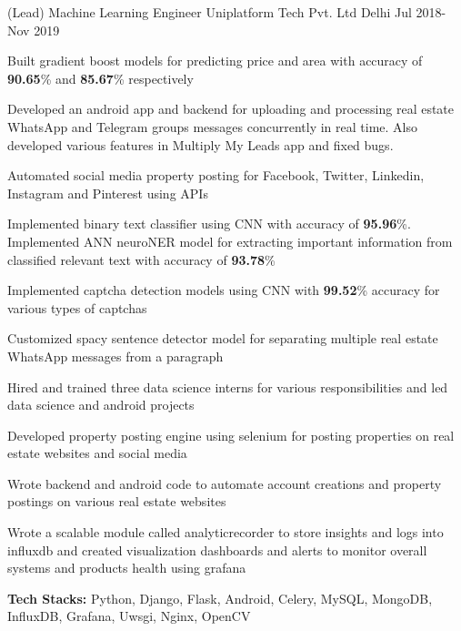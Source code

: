 \begin{cventries}
  \cventry
    {(Lead) Machine Learning Engineer} %
    {Uniplatform Tech Pvt. Ltd} %
    {Delhi} %
    {Jul 2018- Nov 2019} %
    {
      \begin{cvitems} %
        \item{Built gradient boost models for predicting price and area with accuracy of \textbf{90.65}\% and \textbf{85.67}\% respectively}
        \item {Developed an android app and backend for uploading and processing real estate WhatsApp and Telegram groups messages concurrently in real time. Also developed various features in Multiply My Leads app and fixed bugs.}
        \item {Automated social media property posting for Facebook, Twitter, Linkedin, Instagram and Pinterest using APIs}
        \item {Implemented binary text classifier using CNN with accuracy of \textbf{95.96}\%. Implemented ANN neuroNER model for extracting important information from classified relevant text with accuracy of \textbf{93.78}\%}
        \item {Implemented captcha detection models using CNN with \textbf{99.52}\% accuracy for various types of captchas}
        \item {Customized spacy sentence detector model for separating multiple real estate WhatsApp messages from a paragraph}
        \item {Hired and trained three data science interns for various responsibilities and led data science and android projects}
        \item {Developed property posting engine using selenium for posting properties on real estate websites and social media}
        \item {Wrote backend and android code to automate account creations and property postings on various real estate websites}
        \item {Wrote a scalable module called analyticrecorder to store insights and logs into influxdb and created visualization dashboards and alerts to monitor overall systems and products health using grafana}
        \item {\textbf{Tech Stacks:} Python, Django, Flask, Android, Celery, MySQL, MongoDB, InfluxDB, Grafana, Uwsgi, Nginx, OpenCV}
      \end{cvitems}
    }


\end{cventries}
